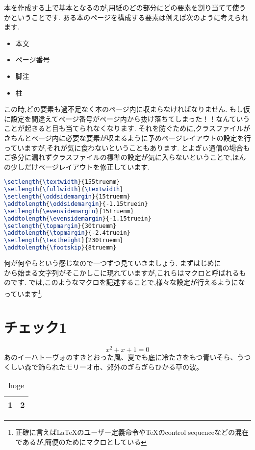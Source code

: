 本を作成する上で基本となるのが,用紙のどの部分にどの要素を割り当てて使うかということです.
ある本のページを構成する要素は例えば次のように考えられます.
\begin{itemize}
	\item 本文
	\item ページ番号
	\item 脚注
	\item 柱
\end{itemize}
この時,どの要素も過不足なく本のページ内に収まらなければなりません.
もし仮に設定を間違えてページ番号がページ内から抜け落ちてしまった！！なんていうことが起きると目も当てられなくなります.
それを防ぐために,クラスファイルがきちんとページ内に必要な要素が収まるように予めページレイアウトの設定を行っていますが,それが気に食わないということもあります.
とよぎぃ通信の場合もご多分に漏れずクラスファイルの標準の設定が気に入らないということで,ほんの少しだけページレイアウトを修正しています.
\begin{lstlisting}[caption = ページレイアウトの修正,label = list:layout,language = tex]
\setlength{\textwidth}{155truemm}
\setlength{\fullwidth}{\textwidth}
\setlength{\oddsidemargin}{15truemm}
\addtolength{\oddsidemargin}{-1.15truein}
\setlength{\evensidemargin}{15truemm}
\addtolength{\evensidemargin}{-1.15truein}
\setlength{\topmargin}{30truemm}
\addtolength{\topmargin}{-2.4truein}
\setlength{\textheight}{230truemm}
\addtolength{\footskip}{8truemm}
\end{lstlisting}
何が何やらという感じなので一つずつ見ていきましょう.
まずはじめに\\から始まる文字列がそこかしこに現れていますが,これらはマクロと呼ばれるものです.
{\pLaTeX}では,このようなマクロを記述することで,様々な設定が行えるようになっています\footnote{正確に言えば{\LaTeX}のユーザー定義命令や{\TeX}のcontrol sequenceなどの混在であるが,簡便のためにマクロとしている}.

\clearpage

\section{チェック1}

\begin{equation}
	x^2 + x + 1 = 0
\end{equation}
あのイーハトーヴォのすきとおった風、夏でも底に冷たさをもつ青いそら、うつくしい森で飾られたモリーオ市、郊外のぎらぎらひかる草の波。
\begin{table}[!ht]
	\centering
	\caption{hoge}
	\label{table:fuga}
	\begin{tabular}{c|c} \hline \hline
	1 & 2 \\ \hline
	\end{tabular}
\end{table}

